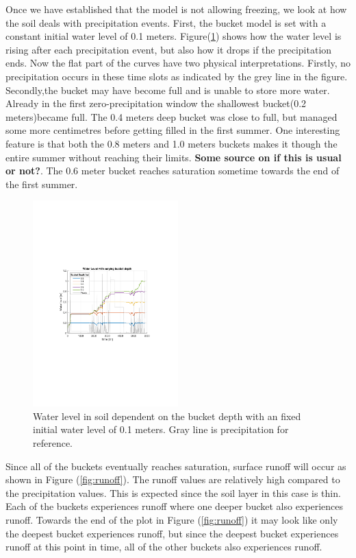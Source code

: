 \documentclass[a4paper,11pt,twocolumn]{article}
\begin{document}
Once we have established that the model is not allowing freezing, we look at how the soil deals with precipitation events. First, the bucket model is set with a constant initial water level of 0.1 meters. Figure(\ref{fig:bucket_fixed}) shows how the water level is rising after each precipitation event, but also how it drops if the precipitation ends. Now the flat part of the curves have two physical interpretations. Firstly, no precipitation occurs in these time slots as indicated by the grey line in the figure. Secondly,the bucket may have become full and is unable to store more water. Already in the first zero-precipitation window the shallowest bucket(0.2 meters)became full. The 0.4 meters deep bucket was close to full, but managed some more centimetres before getting filled in the first summer.
One interesting feature is that both the 0.8 meters and 1.0 meters buckets makes it though the entire summer without reaching their limits. \textbf{Some source on if this is usual or not?}. The 0.6 meter bucket reaches saturation sometime towards the end of the first summer. 

\begin{figure}[h]
	\centering 
	\includegraphics[width=0.5\textwidth]{figures/bucket_depth_fixed}
	\caption{Water level in soil dependent on the bucket depth with an fixed initial water level of 0.1 meters. Gray line is precipitation for reference.}
	\label{fig:bucket_fixed}
\end{figure}

Since all of the buckets eventually reaches saturation, surface runoff will occur as shown in Figure (\ref{fig:runoff}). The runoff values are relatively high compared to the precipitation values. This is expected since the soil layer in this case is thin. Each of the buckets experiences runoff where one deeper bucket also experiences runoff. Towards the end of the plot in Figure (\ref{fig:runoff}) it may look like only the deepest bucket experiences runoff, but since the deepest bucket experiences runoff at this point in time, all of the other buckets also experiences runoff. 
\end{document}
